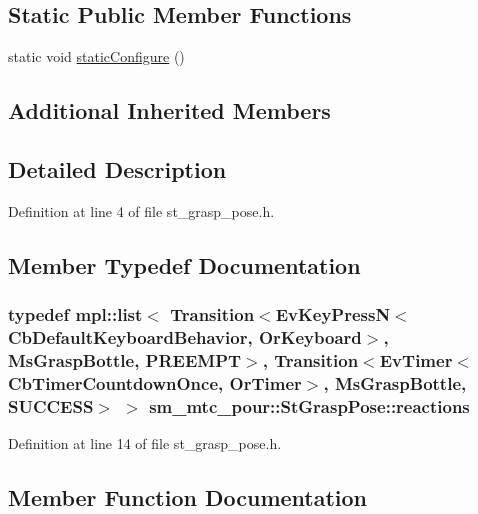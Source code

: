 \subsection*{Static Public Member Functions}
\begin{DoxyCompactItemize}
\item 
static void \hyperlink{structsm__mtc__pour_1_1StGraspPose_a9f25c4e1457d1ecfdcb53221f4cd3ac5}{static\+Configure} ()
\end{DoxyCompactItemize}
\subsection*{Additional Inherited Members}


\subsection{Detailed Description}


Definition at line 4 of file st\+\_\+grasp\+\_\+pose.\+h.



\subsection{Member Typedef Documentation}
\subsubsection[{\texorpdfstring{reactions}{reactions}}]{\setlength{\rightskip}{0pt plus 5cm}typedef mpl\+::list$<$ Transition$<$Ev\+Key\+PressN$<$Cb\+Default\+Keyboard\+Behavior, {\bf Or\+Keyboard}$>$, {\bf Ms\+Grasp\+Bottle}, {\bf P\+R\+E\+E\+M\+PT}$>$, Transition$<$Ev\+Timer$<$Cb\+Timer\+Countdown\+Once, {\bf Or\+Timer}$>$, {\bf Ms\+Grasp\+Bottle}, {\bf S\+U\+C\+C\+E\+SS}$>$ $>$ {\bf sm\+\_\+mtc\+\_\+pour\+::\+St\+Grasp\+Pose\+::reactions}}\hypertarget{structsm__mtc__pour_1_1StGraspPose_a7b45a3a9aae372102711af66a1eecbda}{}\label{structsm__mtc__pour_1_1StGraspPose_a7b45a3a9aae372102711af66a1eecbda}


Definition at line 14 of file st\+\_\+grasp\+\_\+pose.\+h.



\subsection{Member Function Documentation}
